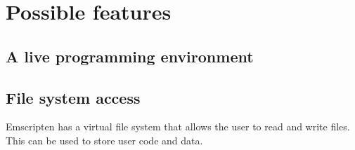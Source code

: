 \section{Possible features}
\subsection{A live programming environment}


\subsection{File system access}
Emscripten has a virtual file system that allows the user to read and write files. This can be used to store user code and data.
